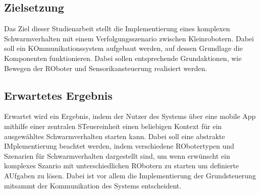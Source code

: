 \subsection{Zielsetzung}

Das Ziel dieser Studienarbeit stellt die Implementierung eines komplexen Schwarmverhalten mit einem Verfolgungsszenario zwischen Kleinrobotern. Dabei soll ein KOmmunikationssystem aufgebaut werden, auf dessen Grundlage die Komponenten funktionieren. Dabei sollen entsprechende Grundaktionen, wie Bewegen der ROboter und Sensorikansteuerung realisiert werden.

\subsection{Erwartetes Ergebnis}

Erwartet wird ein Ergebnis, indem der Nutzer des Systems über eine mobile App mithilfe einer zentralen STeuereinheit einen beliebigen Kontext für ein ausgewähltes Schwarmverhalten starten kann. Dabei soll eine abstrakte IMplementierung beachtet werden, indem verschiedene RObotertypen und Szenarien für Schwarmverhalten dargestellt sind, um wenn erwünscht ein komplexes Szanrio mit unterschiedlichen RObotern zu starten um definierte AUfgaben zu lösen. Dabei ist vor allem die Implementierung der Grundsteuerung mitsammt der Kommunikation des Systems entscheident.